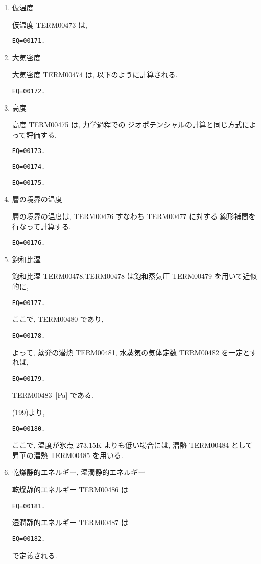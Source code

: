 \begin{enumerate}
\item 仮温度

仮温度 TERM00473 は, 
\begin{verbatim}
EQ=00171.
\end{verbatim}

\item 大気密度

大気密度 TERM00474 は, 以下のように計算される.
\begin{verbatim}
EQ=00172.
\end{verbatim}

\item 高度

高度 TERM00475 は, 力学過程での
ジオポテンシャルの計算と同じ方式によって評価する.
\begin{verbatim}
EQ=00173.
\end{verbatim}
\begin{verbatim}
EQ=00174.
\end{verbatim}
%
\begin{verbatim}
EQ=00175.
\end{verbatim}


\item 層の境界の温度

層の境界の温度は, TERM00476 すなわち TERM00477 に対する
線形補間を行なって計算する.
\begin{verbatim}
EQ=00176.
\end{verbatim}

\item 飽和比湿

飽和比湿 TERM00478,TERM00478
は飽和蒸気圧 TERM00479 を用いて近似的に,
%
\begin{verbatim}
EQ=00177.
\end{verbatim}
%
ここで, TERM00480 であり,
%
\begin{verbatim}
EQ=00178.
\end{verbatim}
%
よって, 蒸発の潜熱 TERM00481, 水蒸気の気体定数 TERM00482 を一定とすれば,
%
\begin{verbatim}
EQ=00179.
\end{verbatim}
%
TERM00483\ [Pa] である.

(199)より,
%
\begin{verbatim}
EQ=00180.
\end{verbatim}

ここで, 温度が氷点 273.15K よりも低い場合には,
潜熱 TERM00484 として昇華の潜熱 TERM00485 を用いる.

\item 乾燥静的エネルギー, 湿潤静的エネルギー

乾燥静的エネルギー TERM00486 は
\begin{verbatim}
EQ=00181.
\end{verbatim}
%
湿潤静的エネルギー TERM00487 は
\begin{verbatim}
EQ=00182.
\end{verbatim}
で定義される.

\end{enumerate}
